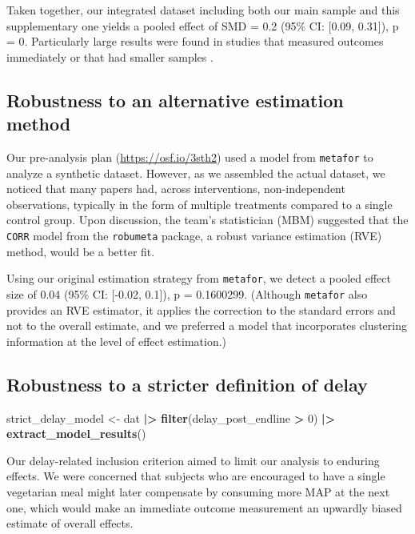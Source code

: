 \documentclass[sn-nature,referee,pdflatex]{sn-jnl}
\newenvironment{Shaded}{\begin{snugshade}}{\end{snugshade}}
\newcommand{\DecValTok}[1]{\textcolor[rgb]{0.00,0.00,0.81}{#1}}
\newcommand{\FunctionTok}[1]{\textcolor[rgb]{0.13,0.29,0.53}{\textbf{#1}}}
\newcommand{\NormalTok}[1]{#1}
\newcommand{\OtherTok}[1]{\textcolor[rgb]{0.56,0.35,0.01}{#1}}
\newcommand{\SpecialCharTok}[1]{\textcolor[rgb]{0.81,0.36,0.00}{\textbf{#1}}}
\begin{document}
Taken together, our integrated dataset including both our main sample
and this supplementary one yields a pooled effect of SMD = 0.2 (95\% CI:
{[}0.09, 0.31{]}), p = 0. Particularly large results were found in
studies that measured outcomes immediately \citep{hansen2021} or that
had smaller samples \citep{lentz2020}.

\subsection{Robustness to an alternative estimation
method}\label{Sec5.1.2}

Our pre-analysis plan (\url{https://osf.io/3sth2}) used a model from
\texttt{metafor} to analyze a synthetic dataset. However, as we
assembled the actual dataset, we noticed that many papers had, across
interventions, non-independent observations, typically in the form of
multiple treatments compared to a single control group. Upon discussion,
the team's statistician (MBM) suggested that the \texttt{CORR} model
from the \texttt{robumeta} package, a robust variance estimation (RVE)
method, would be a better fit.

Using our original estimation strategy from \texttt{metafor}, we detect
a pooled effect size of 0.04 (95\% CI: {[}-0.02, 0.1{]}), p = 0.1600299.
(Although \texttt{metafor} also provides an RVE estimator, it applies
the correction to the standard errors and not to the overall estimate,
and we preferred a model that incorporates clustering information at the
level of effect estimation.)

\subsection{Robustness to a stricter definition of
delay}\label{Sec5.1.3}

\begin{Shaded}
\begin{Highlighting}[]
\NormalTok{strict\_delay\_model }\OtherTok{\textless{}{-}}\NormalTok{ dat }\SpecialCharTok{|\textgreater{}} \FunctionTok{filter}\NormalTok{(delay\_post\_endline }\SpecialCharTok{\textgreater{}} \DecValTok{0}\NormalTok{) }\SpecialCharTok{|\textgreater{}} \FunctionTok{extract\_model\_results}\NormalTok{()}
\end{Highlighting}
\end{Shaded}

Our delay-related inclusion criterion aimed to limit our analysis to
enduring effects. We were concerned that subjects who are encouraged to
have a single vegetarian meal might later compensate by consuming more
MAP at the next one, which would make an immediate outcome measurement
an upwardly biased estimate of overall effects.
\end{document}
